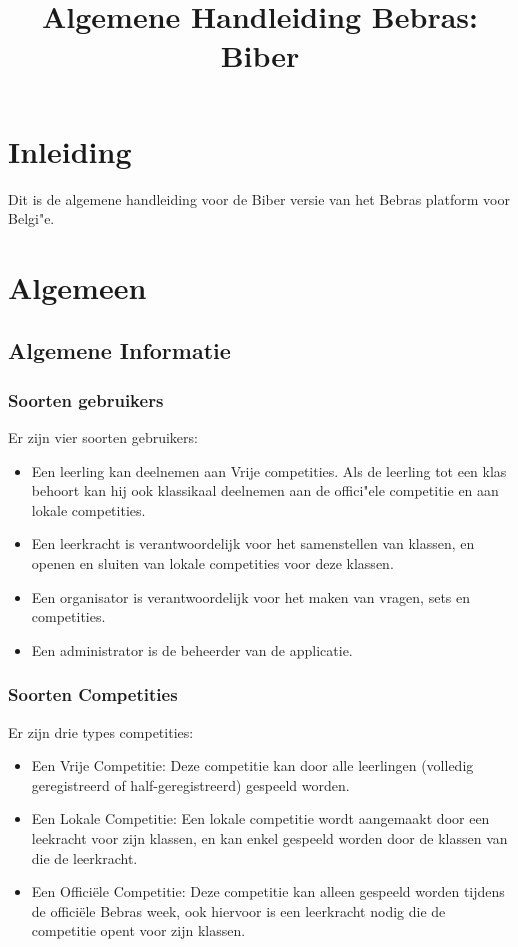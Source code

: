 \documentclass[11pt,a4paper]{report}
\title{Algemene Handleiding Bebras:\\ Biber}
\begin{document}
\maketitle
\parindent 0pt
\tableofcontents

\chapter{Inleiding}
Dit is de algemene handleiding voor de Biber versie van het Bebras platform voor Belgi"e. 

\chapter{Algemeen}


\section{Algemene Informatie}
\subsection{Soorten gebruikers}
Er zijn vier soorten gebruikers:
\begin{itemize}
\item Een leerling kan deelnemen aan Vrije competities. Als de leerling tot een klas behoort kan hij ook klassikaal deelnemen aan de offici"ele competitie en aan lokale competities.
\item Een leerkracht is verantwoordelijk voor het samenstellen van klassen, en openen en sluiten van lokale competities voor deze klassen.
\item Een organisator is verantwoordelijk voor het maken van vragen, sets en competities.
\item Een administrator is de beheerder van de applicatie.
\end{itemize}

\subsection{Soorten Competities}
Er zijn drie types competities:
\begin{itemize}
\item Een Vrije Competitie: Deze competitie kan door alle leerlingen (volledig geregistreerd of half-geregistreerd) gespeeld worden.
\item Een Lokale Competitie: Een lokale competitie wordt aangemaakt door een leekracht voor zijn klassen, 
en kan enkel gespeeld worden door de klassen van die de leerkracht.
\item Een Offici\"ele Competitie: Deze competitie kan alleen gespeeld worden tijdens de offici\"ele Bebras week, 
ook hiervoor is een leerkracht nodig die de competitie opent voor zijn klassen.
\end{itemize}
\end{document}
